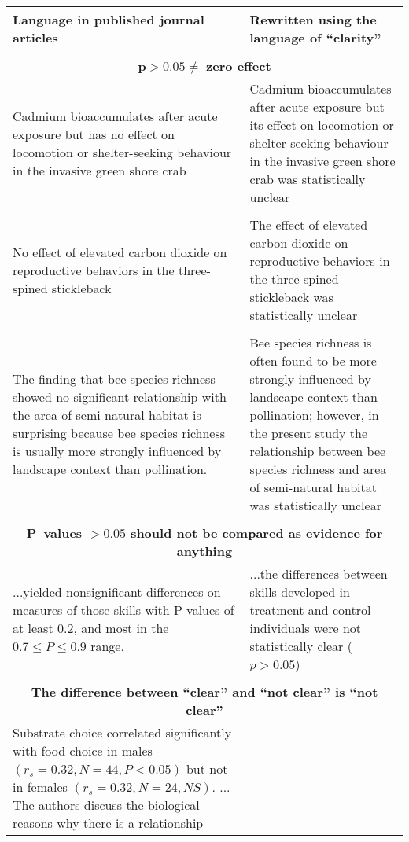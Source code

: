 \begin{tabular}{p{7.5cm}p{7.5cm}}
     Language in published journal articles & Rewritten using the language of ``clarity'' \\
     	\hline
        \\
     \multicolumn{2}{c}{$\mathbf{p > 0.05 \neq}$ \textbf{zero effect}} \\
        Cadmium bioaccumulates after acute exposure but has no effect on locomotion or shelter-seeking behaviour in the
        invasive green shore crab & Cadmium bioaccumulates after acute exposure but its effect on locomotion or shelter-seeking 
        behaviour in the invasive green shore crab was statistically unclear \\ 
        \\
        No effect of elevated carbon dioxide on reproductive behaviors in the three-spined stickleback & The effect of elevated 
        carbon dioxide on reproductive behaviors in the three-spined stickleback was statistically unclear \\
        \\
        The finding that bee species richness showed no significant relationship with the area of semi-natural habitat is 
        surprising because bee species richness is usually more strongly influenced by landscape context than pollination. & 
        Bee species richness is often found to be more strongly influenced by landscape context than pollination; however, 
        in the present study the relationship between bee species richness and area of semi-natural habitat was statistically 
        unclear \\ 
        \\
     \multicolumn{2}{c}{\textbf{P~values $\mathbf{> 0.05}$ should not be compared as evidence for anything}} \\
        ...yielded nonsignificant differences on measures of those skills with P values of at least 0.2, and most in the
        $0.7 \leq P \leq 0.9$ range. & ...the differences between skills developed in treatment and control individuals
        were not statistically clear ($p > 0.05$) \\
        \\
     \multicolumn{2}{c}{\textbf{The difference between ``clear'' and ``not clear'' is ``not clear''}} \\
        Substrate choice correlated significantly with food choice in males $(r_{s} = 0.32, N = 44, P < 0.05)$ but not in
        females $(r_{s} = 0.32, N = 24, NS)$. ... The authors discuss the biological reasons why there is a relationship 

\end{tabular}
